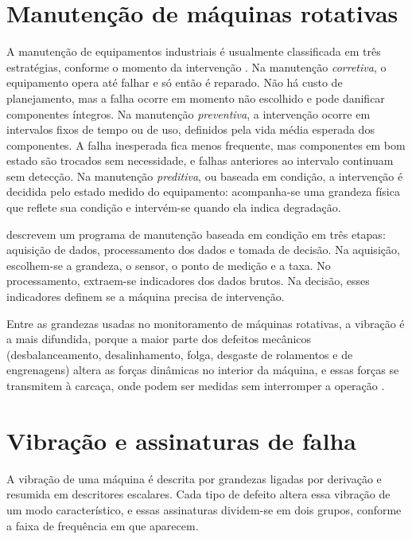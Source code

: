 \section{Manutenção de máquinas rotativas}
\label{sec:fund-manutencao}

A manutenção de equipamentos industriais é usualmente classificada em três estratégias, conforme o
momento da intervenção \cite{mobley2002}. Na manutenção \emph{corretiva}, o equipamento opera até
falhar e só então é reparado. Não há custo de planejamento, mas a falha ocorre em momento não
escolhido e pode danificar componentes íntegros. Na manutenção \emph{preventiva}, a intervenção
ocorre em intervalos fixos de tempo ou de uso, definidos pela vida média esperada dos componentes. A
falha inesperada fica menos frequente, mas componentes em bom estado são trocados sem necessidade, e
falhas anteriores ao intervalo continuam sem detecção. Na manutenção \emph{preditiva}, ou baseada em
condição, a intervenção é decidida pelo estado medido do equipamento: acompanha-se uma grandeza
física que reflete sua condição e intervém-se quando ela indica degradação.

 descrevem um programa de manutenção baseada em condição em três etapas:
aquisição de dados, processamento dos dados e tomada de decisão. Na aquisição, escolhem-se a grandeza,
o sensor, o ponto de medição e a taxa. No processamento, extraem-se indicadores dos dados brutos. Na
decisão, esses indicadores definem se a máquina precisa de intervenção.

Entre as grandezas usadas no monitoramento de máquinas rotativas, a vibração é a mais difundida,
porque a maior parte dos defeitos mecânicos (desbalanceamento, desalinhamento, folga, desgaste de
rolamentos e de engrenagens) altera as forças dinâmicas no interior da máquina, e essas forças se
transmitem à carcaça, onde podem ser medidas sem interromper a operação \cite{randall2011livro}.

\section{Vibração e assinaturas de falha}
\label{sec:fund-vibracao}

A vibração de uma máquina é descrita por grandezas ligadas por derivação e resumida em descritores
escalares. Cada tipo de defeito altera essa vibração de um modo característico, e essas assinaturas
dividem-se em dois grupos, conforme a faixa de frequência em que aparecem.

